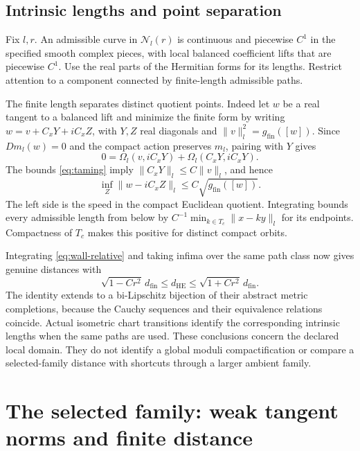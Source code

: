 \documentclass[11pt]{amsart}
\theoremstyle{definition}
\theoremstyle{remark}
\newcommand{\cN}{\mathcal N}
\begin{document}
\subsection{Intrinsic lengths and point separation}
Fix $l,r$. An admissible curve in $\cN_l(r)$ is continuous and
piecewise $C^1$ in the specified smooth complex pieces, with local
balanced coefficient lifts that are piecewise $C^1$. Use the real
parts of the Hermitian forms for its lengths. Restrict attention to
a component connected by finite-length admissible paths.

The finite length separates distinct quotient points. Indeed let $w$
be a real tangent to a balanced lift and minimize the finite form by
writing $w=v+C_xY+iC_xZ$, with $Y,Z$ real diagonals and
$\|v\|_l^2=g_{\mathrm{fin}}([w])$. Since $Dm_l(w)=0$ and the
compact action preserves $m_l$, pairing with $Y$ gives
\[
 0=\Omega_l(v,iC_xY)+\Omega_l(C_xY,iC_xY).
\]
The bounds \eqref{eq:taming} imply $\|C_xY\|_l\le C\|v\|_l$,
and hence
\begin{equation}\label{eq:compact-speed-bound}
 \inf_Z\|w-iC_xZ\|_l\le C\sqrt{g_{\mathrm{fin}}([w])}.
\end{equation}
The left side is the speed in the compact Euclidean quotient.
Integrating bounds every admissible length from below by
$C^{-1}\min_{k\in T_c}\|x-ky\|_l$ for its endpoints. Compactness
of $T_c$ makes this positive for distinct compact orbits.

Integrating \eqref{eq:wall-relative} and taking infima over the same
path class now gives genuine distances with
\begin{equation}\label{eq:wall-lengths}
 \sqrt{1-Cr^2}\,d_{\mathrm{fin}}
 \le d_{\mathrm{HE}}\le\sqrt{1+Cr^2}\,d_{\mathrm{fin}}.
\end{equation}
The identity extends to a bi-Lipschitz bijection of their abstract
metric completions, because the Cauchy sequences and their equivalence
relations coincide. Actual isometric chart transitions identify the
corresponding intrinsic lengths when the same paths are used.
These conclusions concern the declared local domain. They do not
identify a global moduli compactification or compare a selected-family
distance with shortcuts through a larger ambient family.

\section{The selected family: weak tangent norms and finite distance}\label{sec:selected-metrics}
\end{document}
